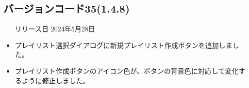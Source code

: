 \subsection*{バージョンコード35(1.4.8)}
\begin{itemize}
    \item[リリース日] 2024年5月28日
\end{itemize}

\new
\begin{itemize}
    \item プレイリスト選択ダイアログに新規プレイリスト作成ボタンを追加しました。
\end{itemize}

\change

\fix
\begin{itemize}
    \item プレイリスト作成ボタンのアイコン色が、ボタンの背景色に対応して変化するように修正しました。
\end{itemize}

